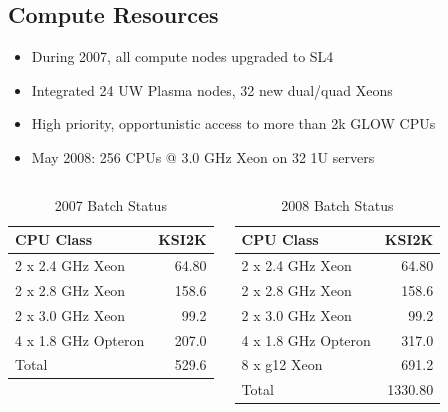 \documentclass{beamer}
\begin{document}
\subsection{Compute Resources}
\begin{frame}
\begin{itemize}
    \item During 2007, all compute nodes upgraded to SL4
    \item Integrated 24 UW Plasma nodes, 32 new dual/quad Xeons
    \item High priority, opportunistic access to more than 2k GLOW CPUs
    \item May 2008: 256 CPUs @ 3.0 GHz Xeon on 32 1U servers
\end{itemize}
\begin{columns}
\column{2.5in}
\begin{table}
    \begin{tabular}{lr}
        \toprule
        CPU Class           & KSI2K \\
        \midrule
        2 x 2.4 GHz Xeon    & 64.80 \\    %
        2 x 2.8 GHz Xeon    & 158.6 \\    %
        2 x 3.0 GHz Xeon    & 99.2 \\     %
        4 x 1.8 GHz Opteron & 207.0 \\    %
        \midrule
        Total & 529.6 \\
        \bottomrule
    \end{tabular}
    \caption{2007 Batch Status}
    \label{2007_Batch_status}
\end{table}

\column{2.5in}
\begin{table}
    \begin{tabular}{lr}
        \toprule
        CPU Class           & KSI2K \\
        \midrule
        2 x 2.4 GHz Xeon    & 64.80 \\    %
        2 x 2.8 GHz Xeon    & 158.6 \\    %
        2 x 3.0 GHz Xeon    & 99.2 \\     %
        4 x 1.8 GHz Opteron & 317.0 \\    %
        8 x g12 Xeon        & 691.2 \\    %
        \midrule
        Total & 1330.80 \\
        \bottomrule
    \end{tabular}
    \caption{2008 Batch Status}
    \label{2008_Batch_status}
\end{table}
\end{columns}
\end{frame}
\end{document}
